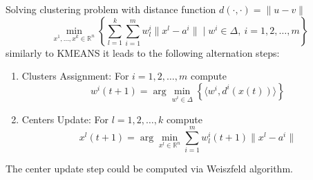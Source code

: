 \documentclass[11pt]{article}
\numberwithin{equation}{section}
\begin{document}
Solving clustering problem with distance function $d(\cdot,\cdot) = \| u - v \|$
\begin{equation*}
	\min_{x^1, \ldots, x^k \in \mathbb{R}^n} \left\lbrace \sum\limits_{l=1}^{k} \sum\limits_{i=1}^{m} w^i_l \|x^l -a^i \| \mid w^i \in \Delta, \: i=1,2, \ldots, m \right\rbrace
\end{equation*}
similarly to KMEANS it leads to the following alternation steps: \\
\begin{enumerate}[(1)]
	\item Clusters Assignment: For $i=1, 2, \ldots ,m$ compute
		\begin{equation}
			w^i(t+1) = \arg\min\limits_{w^i \in \Delta} \left\lbrace \langle w^i , d^i(x(t)) \rangle\right\rbrace \label{StateEq21}
		\end{equation}
		
	\item Centers Update: For $l=1, 2, \ldots ,k$ compute
		\begin{equation}
			x^l(t+1) = \arg\min\limits_{x^l \in \mathbb{R}^n} \sum\limits_{i=1}^{m} w^i_l(t+1) \| x^l -a^i \| \label{StateEq22}
		\end{equation}
\end{enumerate}
The center update step could be computed via Weiszfeld algorithm.

\newpage
\end{document}
